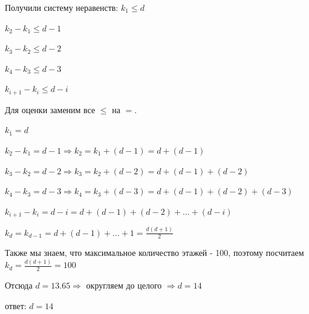 \documentclass{article}
\begin{document}
Получили систему неравенств:
$k_1 \leq d$

$k_2 - k_1 \leq d - 1$

$k_3 - k_2  \leq d-2$

$k_4 - k_3  \leq d-3$

$k_{i+1} - k_i  \leq d-i$

Для оценки заменим все $\leq$ на $=$.

$k_1 = d$

$k_2 - k_1 = d - 1 \Rightarrow k_2 = k_1 + (d-1) = d + (d-1)$

$k_3 - k_2  = d-2 \Rightarrow k_3 = k_2 + (d-2) = d + (d-1) + (d-2)$

$k_4 - k_3  = d-3 \Rightarrow k_4 = k_3 + (d-3) = d + (d-1) + (d-2) + (d-3)$

$k_{i+1} - k_i  = d-i = d + (d-1) + (d-2) + ... + (d-i)$

$k_d = k_{d-1} = d + (d-1) + ... + 1 = \frac{d(d+1)}{2}$

Также мы знаем, что максимальное количество этажей - 100, поэтому посчитаем $k_d = \frac{d(d+1)}{2} = 100$

Отсюда $d = 13.65 \Rightarrow$ округляем до целого $\Rightarrow d = 14$

ответ: $d = 14$


\bigskip
\end{document}
